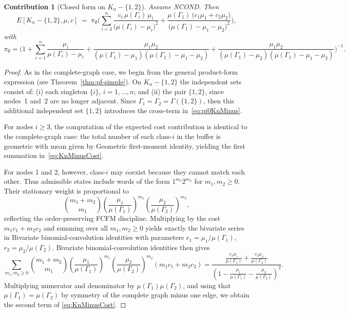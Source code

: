 \documentclass[11pt]{article}
\newtheorem{contribution}{Contribution}
\begin{document}
\begin{contribution}[Closed form on $K_n-\{1,2\}$]\label{prop:Kn12}
	Assume \textsc{NCOND}. Then
	\begin{equation}\label{eq:KnMinusCost}
		E[K_n-\{1,2\},\mu,c]
		\;=\;
		\pi_{\emptyset}\Biggl(
		\sum_{i=3}^n \frac{c_i\,\mu(\Gamma_i)\,\mu_i}{\bigl(\mu(\Gamma_i)-\mu_i\bigr)^2}+\frac{\mu(\Gamma_1)\,\bigl(c_1\mu_1+c_2\mu_2\bigr)}
		{\bigl(\mu(\Gamma_1)-\mu_1-\mu_2\bigr)^2}
		\Biggr),
	\end{equation}
	with
	\begin{equation}\label{eq:pi0KnMinus}
		\pi_{\emptyset}
		=\Biggl(1+\sum_{i=1}^n \frac{\mu_i}{\mu(\Gamma_i)-\mu_i}
		+\frac{\mu_1\mu_2}{(\mu(\Gamma_1)-\mu_1)(\mu(\Gamma_1)-\mu_1-\mu_2)}
		+\frac{\mu_1\mu_2}{(\mu(\Gamma_1)-\mu_2)(\mu(\Gamma_1)-\mu_1-\mu_2)}\Biggr)^{-1}.
	\end{equation}
\end{contribution}

\begin{proof}
	As in the complete-graph case, we begin from the general product-form expression 
	(see Theorem~\ref{thm:pf-simple}). 
	On $K_n-\{1,2\}$ the independent sets consist of:
	(i) each singleton $\{i\}$, $i=1,\dots,n$; and (ii) the pair $\{1,2\}$, since nodes~1 and~2 are no longer adjacent. 
	Since $\Gamma_1=\Gamma_2=\Gamma(\{1,2\})$, then this additional independent set $\{1,2\}$ introduces the cross-term in~\eqref{eq:pi0KnMinus}.
	
	For nodes $i\geq 3$, the computation of the expected cost contribution is identical to the 
	complete-graph case: the total number of each class-$i$ in the buffer is geometric with mean given by Geometric first-moment identity, yielding the first summation in~\eqref{eq:KnMinusCost}.
	
	For nodes 1 and 2, however, class-$i$ may coexist because they cannot match each other. 
	Thus admissible states include words of the form $1^{m_1}2^{m_2}$ for $m_1,m_2\ge 0$. 
	Their stationary weight is proportional to
	$$
	\binom{m_1+m_2}{m_1}
	\left(\frac{\mu_1}{\mu(\Gamma_1)}\right)^{m_1}
	\left(\frac{\mu_2}{\mu(\Gamma_2)}\right)^{m_2},
	$$
	reflecting the order-preserving FCFM discipline. Multiplying by the cost 
	$m_1 c_1 + m_2 c_2$ and summing over all $m_1,m_2\ge 0$ yields exactly the bivariate 
	series in Bivariate binomial-convolution identities with parameters 
	$r_1=\mu_1/\mu(\Gamma_1)$, $r_2=\mu_2/\mu(\Gamma_2)$. 
Bivariate binomial-convolution identities then gives
	\begin{equation}
		\sum_{m_1,m_2\geq0}
		\binom{m_1+m_2}{m_1} 
		\left(\frac{\mu_1}{\mu(\Gamma_1)}\right)^{m_1}
		\left(\frac{\mu_2}{\mu(\Gamma_2)}\right)^{m_2}
		(m_1 c_1+m_2 c_2)
		=\frac{\frac{c_1\mu_1}{\mu(\Gamma_1)}+\frac{c_2\mu_2}{\mu(\Gamma_2)}}{(1-\frac{\mu_1}{\mu(\Gamma_1)}-\frac{\mu_2}{\mu(\Gamma_2)})^2}.
	\end{equation}
	Multiplying numerator and denominator by $\mu(\Gamma_1)\mu(\Gamma_2)$, 
	and using that $\mu(\Gamma_1)=\mu(\Gamma_2)$ by symmetry of the complete graph minus 
	one edge, we obtain the second term of \eqref{eq:KnMinusCost}.
\end{proof}
\end{document}
